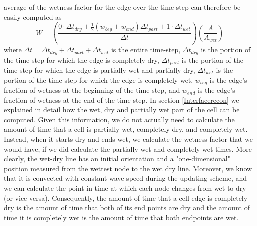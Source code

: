 \documentclass[review]{elsarticle}
\begin{document}
average of the wetness factor for the edge over the time-step can 
therefore be easily computed as
\begin{equation}
        W=\left(\frac{0\cdot\Delta t_{dry} +\frac{1}{2}(w_{beg}+w_{end})\Delta t_{part}+1\cdot\Delta t_{wet}}{\Delta t}\right) \left(\frac{A}{A_{wet}}\right)
        \label{wetnessfactor}
\end{equation}
where $\Delta t=\Delta t_{dry}+\Delta t_{part}+\Delta t_{wet}$ is the 
entire time-step, $\Delta t_{dry}$ is the portion of the time-step for 
which the edge is completely dry, $\Delta t_{part}$ is the portion of 
the time-step for which the edge is partially wet and partially dry, 
$\Delta t_{wet}$ is the portion of the time-step for which the edge is 
completely wet, $w_{beg}$ is the edge's fraction of wetness at the 
beginning of the time-step, and $w_{end}$ is the edge's fraction of 
wetness at the end of the time-step.
In section \ref{Interfacerecon} we explained in detail how the wet, dry and partially wet part of the cell can be computed.
 Given this information, we do not actually need to calculate the amount of time that a cell is partially wet, completely dry, 
 and completely wet. Instead, when it starts dry and ends wet, we calculate the wetness factor that we would have, 
 if we did calculate the partially wet and completely wet times. More clearly, the wet-dry line has an initial orientation and a "one-dimensional" position measured from the wettest node to the wet dry line. Moreover, we know that it is convected with constant wave speed  during the updating scheme, and we can calculate the point in time at which each node changes from wet to dry (or vice versa). Consequently, the amount of time that a cell edge is completely dry is the amount of time that both of its end points are dry and the amount of time it is completely wet is the amount of time that both  endpoints are wet.
 
\end{document}
